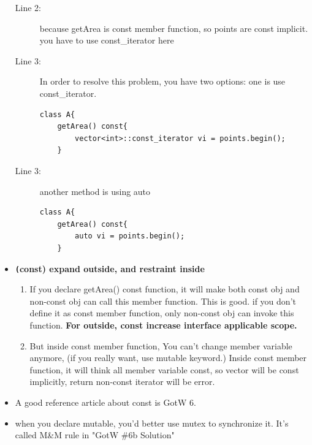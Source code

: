 \documentclass[a4paper,11pt,twoside]{book}
\begin{document}
\begin{itemize}
\begin{description}
	\item[Line 2:] because getArea is const member function, so points are const implicit. you have to use const\_iterator here
	
	\item[Line 3:] In order to resolve this problem, you have two options: one is use const\_iterator. 
\begin{lstlisting}[numbers=none]
class A{
	getArea() const{
		vector<int>::const_iterator vi = points.begin();
	}
\end{lstlisting}
	
	\item[Line 3:] another method is using auto
	
\begin{lstlisting}[numbers=none]
class A{
	getArea() const{
		auto vi = points.begin();
	}
\end{lstlisting}

\end{description}

	\item \textbf{\texttt(const) expand outside, and restraint inside}
	\begin{enumerate}
		\item If you declare getArea() const function, it will make both const obj and non-const obj can call this member function. This is good. if you don't define it as const member function, only non-const obj can invoke this function. \textbf{For outside, const increase interface applicable scope.}
		
		\item But inside const member function, You can't change member variable anymore, (if you really want, use mutable keyword.) Inside const member function, it will think all member variable const, so vector will be const implicitly, return non-const iterator will be error.
	\end{enumerate}

	\item A good reference article about const is GotW 6. 
	\item when you declare mutable, you'd better use mutex to synchronize it. It's called M\&M rule in "GotW \#6b Solution"
\end{itemize}
\end{document}
